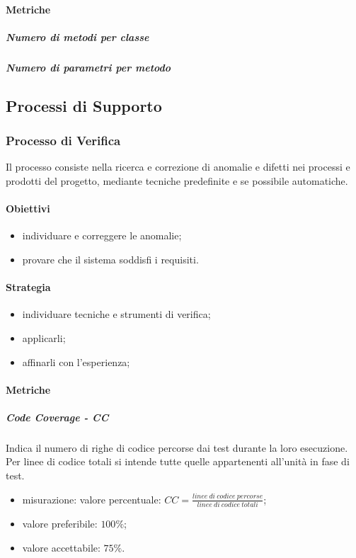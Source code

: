 		\paragraph{Metriche}
			\subparagraph{Numero di metodi per classe}
			\subparagraph{Numero di parametri per metodo}
		
\subsection{Processi di Supporto}
	\subsubsection{Processo di Verifica}
	Il processo consiste nella ricerca e correzione di anomalie e difetti nei processi e prodotti del progetto, mediante tecniche predefinite e se possibile automatiche.
		\paragraph{Obiettivi}
		\begin{itemize}
			\item individuare e correggere le anomalie;
			\item provare che il sistema soddisfi i requisiti.
		\end{itemize}	
		\paragraph{Strategia}
		\begin{itemize}
			\item individuare tecniche e strumenti di verifica;
			\item applicarli;
			\item affinarli con l'esperienza;
		\end{itemize}	
		\paragraph{Metriche}
			\subparagraph{Code Coverage - CC}
				Indica il numero di righe di codice percorse dai test durante la loro esecuzione. Per linee di codice totali si intende tutte quelle appartenenti all'unità in fase di test.
				\begin{itemize}
					\item misurazione: valore percentuale: $CC = \frac{linee\ di\ codice\ percorse}{linee\ di\ codice\ totali}$;
					\item valore preferibile: $100\%$;
					\item valore accettabile: $75\%$.
				\end{itemize}

